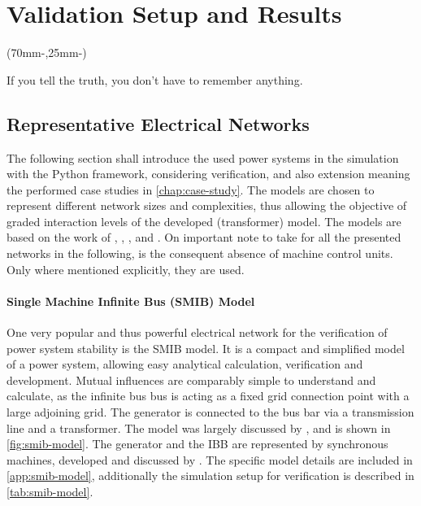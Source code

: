 

\chapter{Validation Setup and Results}
\label{chap:verification}

\begin{textblock*}{.7\textwidth}(70mm-\offset,25mm-\offset)
    \begin{fquote}
        If you tell the truth, you don't have to remember anything.
    \end{fquote}
\end{textblock*}

\section{Representative Electrical Networks}
\label{sec:networks}

The following section shall introduce the used power systems in the simulation with the Python framework, considering verification, and also extension meaning the performed case studies in \autoref{chap:case-study}. 
The models are chosen to represent different network sizes and complexities, thus allowing the objective of graded interaction levels of the developed (transformer) model. 
The models are based on the work of \textcite{machowski_2020}, \textcite{kundur_2022}, \textcite{IEEELoadModeling_2022}, and \textcite{vancutsem_2020}.
On important note to take for all the presented networks in the following, is the consequent absence of machine control units. 
Only where mentioned explicitly, they are used.

\subsubsection{Single Machine Infinite Bus (SMIB) Model}

One very popular and thus powerful electrical network for the verification of power system stability is the \acs{SMIB} model. 
It is a compact and simplified model of a power system, allowing easy analytical calculation, verification and development. 
Mutual influences are comparably simple to understand and calculate, as the infinite bus bus is acting as a fixed grid connection point with a large adjoining grid. 
The generator is connected to the bus bar via a transmission line and a transformer. 
The model was largely discussed by \textcite{kundur_2022}, and is shown in \autoref{fig:smib-model}. 
The generator and the \acs{IBB} are represented by synchronous machines, developed and discussed by \textcite{kordowich_2023}. 
The specific model details are included in \autoref{app:smib-model}, additionally the simulation setup for verification is described in \autoref{tab:smib-model}.

